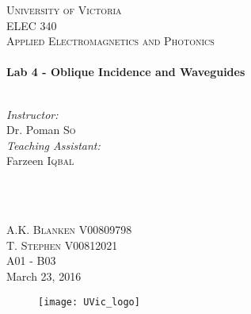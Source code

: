\begin{titlepage}

\center
 
\textsc{\LARGE University of Victoria}\\[1cm] 	%
\textsc{\Large ELEC 340}\\[0.5cm] 			%
\textsc{\large Applied Electromagnetics and Photonics}\\[0.5cm] 		%


\HRule \\[0.4cm]
{\huge \bfseries Lab 4 - Oblique Incidence and Waveguides}\\[0.2cm] %
\HRule \\[1.5cm]
 
 
\begin{minipage}{0.7\textwidth}
\begin{flushleft} 

\large\emph{Instructor:} \\
Dr. Poman \textsc{So} \\
\vspace{12 pt}
\emph{Teaching Assistant:} \\ 
Farzeen \textsc{Iqbal}

\end{flushleft}
\end{minipage}
~
\begin{minipage}{0.1\textwidth}
\begin{flushright} \large

\vspace{12 pt}

\end{flushright}
\end{minipage}\\[2cm]


\Large A.K. \textsc{Blanken}
\large V00809798 \\
\Large T. \textsc{Stephen}
\large V00812021	\\
A01 - B03\\[1.5cm] 


{\large March 23, 2016}\\ %

\begin{figure}[b]
	\centering
	\texttt{[image: UVic\_logo]}
\end{figure}

\end{titlepage}
